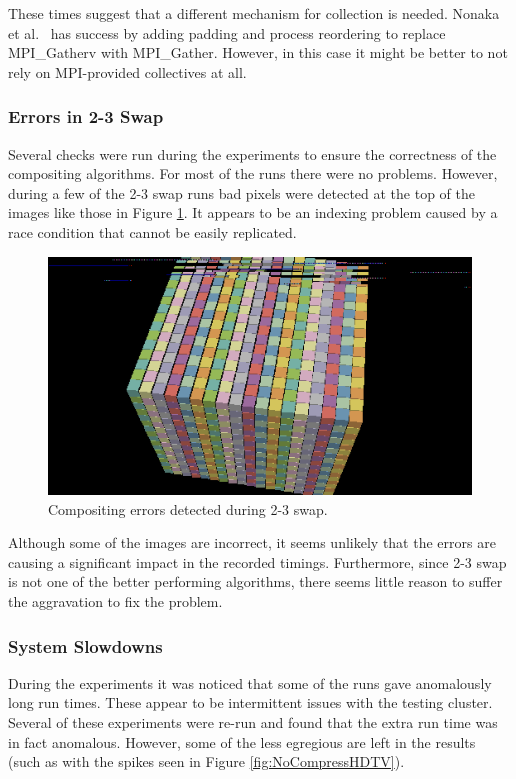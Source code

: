 \documentclass{vgtc}                          %
\newcommand*{\scite}[1]{~\cite{#1}}
\newcommand{\etal}{et al.\xspace}
\newcommand{\textalgorithm}[1]{\textsf{#1}\xspace}
\newcommand{\ttswap}{\textalgorithm{2-3 swap}}
\begin{document}
These times suggest that a different mechanism for collection is needed.
Nonaka \etal\scite{Nonaka2018} has success by adding padding and process reordering to replace MPI\_Gatherv with MPI\_Gather.
However, in this case it might be better to not rely on MPI-provided collectives at all.

\subsubsection{Errors in 2-3 Swap}
\label{sec:2-3SwapErrors}

Several checks were run during the experiments to ensure the correctness of the compositing algorithms.
For most of the runs there were no problems.
However, during a few of the \ttswap runs bad pixels were detected at the top of the images like those in Figure \ref{fig:BadComposite23Swap}.
It appears to be an indexing problem caused by a race condition that cannot be easily replicated.

\begin{figure}[htb]
  \centering
  \includegraphics[width=.5\linewidth]{bad-composite-2-3-swap}
  \caption{Compositing errors detected during \ttswap.}
  \label{fig:BadComposite23Swap}
\end{figure}

Although some of the images are incorrect, it seems unlikely that the errors are causing a significant impact in the recorded timings.
Furthermore, since \ttswap is not one of the better performing algorithms, there seems little reason to suffer the aggravation to fix the problem.

\subsubsection{System Slowdowns}

During the experiments it was noticed that some of the runs gave anomalously long run times.
These appear to be intermittent issues with the testing cluster.
Several of these experiments were re-run and found that the extra run time was in fact anomalous.
However, some of the less egregious are left in the results (such as with the spikes seen in Figure \ref{fig:NoCompressHDTV}).
\end{document}
